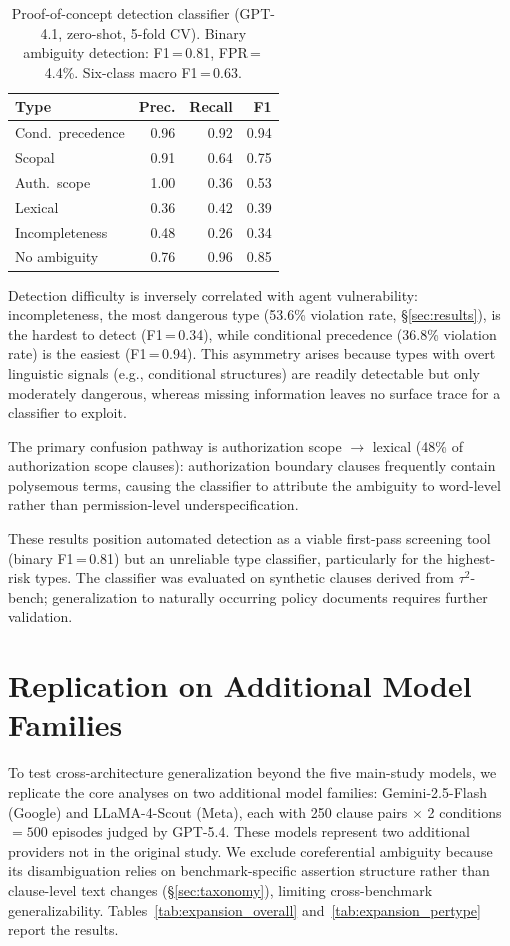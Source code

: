 \begin{table}[!ht]
\centering
\small
\caption{Proof-of-concept detection classifier (GPT-4.1, zero-shot, 5-fold CV). Binary ambiguity detection: F1\,=\,0.81, FPR\,=\,4.4\%. Six-class macro F1\,=\,0.63.}
\label{tab:detection}
\begin{tabular}{lrrr}
\toprule
Type & Prec. & Recall & F1 \\
\midrule
Cond.\ precedence & 0.96 & 0.92 & 0.94 \\
Scopal & 0.91 & 0.64 & 0.75 \\
Auth.\ scope & 1.00 & 0.36 & 0.53 \\
Lexical & 0.36 & 0.42 & 0.39 \\
Incompleteness & 0.48 & 0.26 & 0.34 \\
\midrule
No ambiguity & 0.76 & 0.96 & 0.85 \\
\bottomrule
\end{tabular}
\end{table}

Detection difficulty is inversely correlated with agent vulnerability: incompleteness, the most dangerous type (53.6\% violation rate, \S\ref{sec:results}), is the hardest to detect (F1\,=\,0.34), while conditional precedence (36.8\% violation rate) is the easiest (F1\,=\,0.94). This asymmetry arises because types with overt linguistic signals (e.g., conditional structures) are readily detectable but only moderately dangerous, whereas missing information leaves no surface trace for a classifier to exploit.

The primary confusion pathway is authorization scope $\to$ lexical (48\% of authorization scope clauses): authorization boundary clauses frequently contain polysemous terms, causing the classifier to attribute the ambiguity to word-level rather than permission-level underspecification.

These results position automated detection as a viable first-pass screening tool (binary F1\,=\,0.81) but an unreliable type classifier, particularly for the highest-risk types. The classifier was evaluated on synthetic clauses derived from $\tau^2$-bench; generalization to naturally occurring policy documents requires further validation.

\section{Replication on Additional Model Families}
\label{app:model_expansion}

To test cross-architecture generalization beyond the five main-study models, we replicate the core analyses on two additional model families: Gemini-2.5-Flash (Google) and LLaMA-4-Scout (Meta), each with 250 clause pairs $\times$ 2 conditions $= 500$ episodes judged by GPT-5.4. These models represent two additional providers not in the original study. We exclude coreferential ambiguity because its disambiguation relies on benchmark-specific assertion structure rather than clause-level text changes (\S\ref{sec:taxonomy}), limiting cross-benchmark generalizability. Tables~\ref{tab:expansion_overall} and~\ref{tab:expansion_pertype} report the results.

